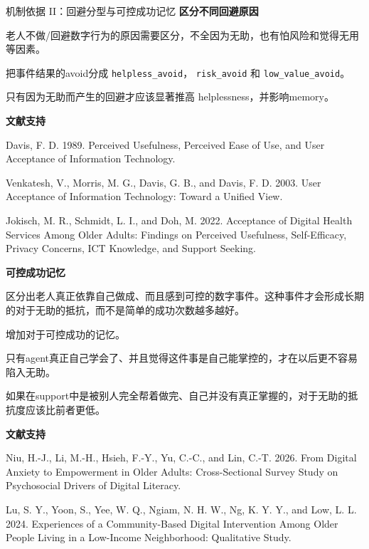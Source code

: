 \documentclass[aspectratio=169]{beamer}
\begin{document}
\begin{frame}[t]{机制依据 II：回避分型与可控成功记忆}
\tiny
\justifying
\textbf{区分不同回避原因}

老人不做/回避数字行为的原因需要区分，不全因为无助，也有怕风险和觉得无用等因素。

把事件结果的avoid分成 \texttt{helpless\_avoid}， \texttt{risk\_avoid} 和 \texttt{low\_value\_avoid}。

只有因为无助而产生的回避才应该显著推高 helplessness，并影响memory。

\vspace{0.12cm}
\textbf{文献支持}

Davis, F. D. 1989. Perceived Usefulness, Perceived Ease of Use, and User Acceptance of Information Technology.

Venkatesh, V., Morris, M. G., Davis, G. B., and Davis, F. D. 2003. User Acceptance of Information Technology: Toward a Unified View.

Jokisch, M. R., Schmidt, L. I., and Doh, M. 2022. Acceptance of Digital Health Services Among Older Adults: Findings on Perceived Usefulness, Self-Efficacy, Privacy Concerns, ICT Knowledge, and Support Seeking.

\vspace{0.16cm}
\textbf{可控成功记忆}

区分出老人真正依靠自己做成、而且感到可控的数字事件。这种事件才会形成长期的对于无助的抵抗，而不是简单的成功次数越多越好。

增加对于可控成功的记忆。

只有agent真正自己学会了、并且觉得这件事是自己能掌控的，才在以后更不容易陷入无助。

如果在support中是被别人完全帮着做完、自己并没有真正掌握的，对于无助的抵抗度应该比前者更低。

\vspace{0.12cm}
\textbf{文献支持}

Niu, H.-J., Li, M.-H., Hsieh, F.-Y., Yu, C.-C., and Lin, C.-T. 2026. From Digital Anxiety to Empowerment in Older Adults: Cross-Sectional Survey Study on Psychosocial Drivers of Digital Literacy.

Lu, S. Y., Yoon, S., Yee, W. Q., Ngiam, N. H. W., Ng, K. Y. Y., and Low, L. L. 2024. Experiences of a Community-Based Digital Intervention Among Older People Living in a Low-Income Neighborhood: Qualitative Study.
\end{frame}
\end{document}
